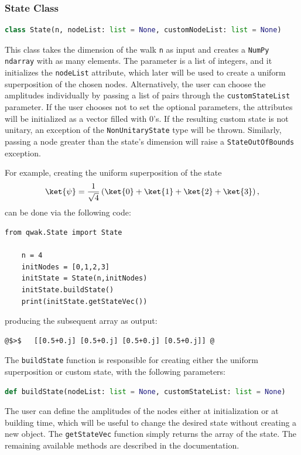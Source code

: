 \documentclass[../../dissertation.tex]{subfiles}
\begin{document}
\subsubsection{State Class}
\begin{lstlisting}[style=commands,language=Python]
    class State(n, nodeList: list = None, customNodeList: list = None)
\end{lstlisting}
This class takes the dimension of the walk \texttt{n} as input and creates a
\texttt{NumPy ndarray} with as many elements. The  parameter is
a list of integers, and it initializes the \texttt{nodeList} attribute, which
later will be used to create a uniform superposition of the chosen nodes.
Alternatively, the user can choose the amplitudes individually by passing a
list of pairs through the \texttt{customStateList} parameter. If the user
chooses not to set the optional parameters, the attributes will be initialized
as a vector filled with $0$'s. If the resulting custom state is not
unitary, an exception of the \texttt{NonUnitaryState} type will be thrown.
Similarly, passing a node greater than the state's dimension will
raise a \texttt{StateOutOfBounds} exception.\par 

For example, creating the uniform superposition of the state
\begin{equation}
    \ket{\psi} = \frac{1}{\sqrt{4}}\left( \ket{0} + \ket{1} +\ket{2} +\ket{3}\right),
\end{equation}
can be done via the following code:
\begin{lstlisting}[style=code]
    from qwak.State import State

    n = 4
    initNodes = [0,1,2,3]
    initState = State(n,initNodes)
    initState.buildState()
    print(initState.getStateVec())
\end{lstlisting}
producing the subsequent array as output:

\begin{lstlisting}[style=commands,mathescape]
@$>$   [[0.5+0.j] [0.5+0.j] [0.5+0.j] [0.5+0.j]] @
\end{lstlisting}

The \texttt{buildState} function is responsible for creating either the uniform
superposition or custom state, with the following parameters: 
\begin{lstlisting}[style=commands,mathescape,language=Python]
    def buildState(nodeList: list = None, customStateList: list = None)
\end{lstlisting}
The user can define the amplitudes of the nodes either at
initialization or at building time, which will be useful to change the desired
state without creating a new object. The \texttt{getStateVec} function simply
returns the array of the state. The remaining available methods are described
in the documentation. 
\end{document}
